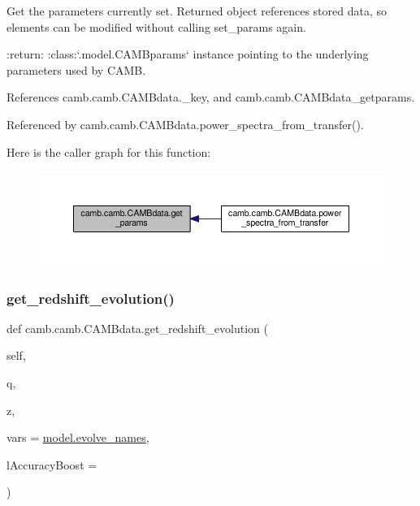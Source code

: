 \begin{DoxyVerb}Get the parameters currently set. Returned object references stored data, so elements can be modified without
calling set_params again.

:return: :class:`.model.CAMBparams` instance pointing to the underlying parameters used by CAMB.
\end{DoxyVerb}
 

References camb.\+camb.\+C\+A\+M\+Bdata.\+\_\+key, and camb.\+camb.\+C\+A\+M\+Bdata\+\_\+getparams.



Referenced by camb.\+camb.\+C\+A\+M\+Bdata.\+power\+\_\+spectra\+\_\+from\+\_\+transfer().

Here is the caller graph for this function\+:
\nopagebreak
\begin{figure}[H]
\begin{center}
\leavevmode
\includegraphics[width=350pt]{classcamb_1_1camb_1_1CAMBdata_a47917b8227d3cacc5e0d28cac7810f95_icgraph}
\end{center}
\end{figure}
\mbox{\label{classcamb_1_1camb_1_1CAMBdata_a429985d3103382ee2faaa702bd125ff8}} 
\subsubsection{\texorpdfstring{get\+\_\+redshift\+\_\+evolution()}{get\_redshift\_evolution()}}
{\footnotesize\ttfamily def camb.\+camb.\+C\+A\+M\+Bdata.\+get\+\_\+redshift\+\_\+evolution (\begin{DoxyParamCaption}\item[{}]{self,  }\item[{}]{q,  }\item[{}]{z,  }\item[{}]{vars = {\ttfamily \mbox{\hyperlink{namespacecamb_1_1model_a54f64726c80596131e388af10aa41cb6}{model.\+evolve\+\_\+names}}},  }\item[{}]{l\+Accuracy\+Boost = {} }\end{DoxyParamCaption})}

